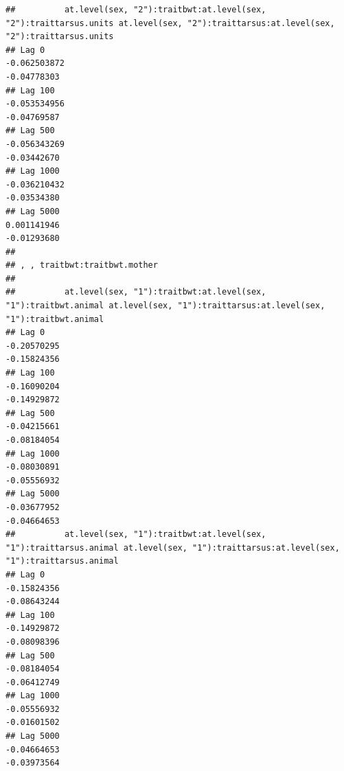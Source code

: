 \documentclass[
  12pt,
]{book}
\begin{document}
\begin{verbatim}
##          at.level(sex, "2"):traitbwt:at.level(sex, "2"):traittarsus.units at.level(sex, "2"):traittarsus:at.level(sex, "2"):traittarsus.units
## Lag 0                                                        -0.062503872                                                         -0.04778303
## Lag 100                                                      -0.053534956                                                         -0.04769587
## Lag 500                                                      -0.056343269                                                         -0.03442670
## Lag 1000                                                     -0.036210432                                                         -0.03534380
## Lag 5000                                                      0.001141946                                                         -0.01293680
## 
## , , traitbwt:traitbwt.mother
## 
##          at.level(sex, "1"):traitbwt:at.level(sex, "1"):traitbwt.animal at.level(sex, "1"):traittarsus:at.level(sex, "1"):traitbwt.animal
## Lag 0                                                       -0.20570295                                                       -0.15824356
## Lag 100                                                     -0.16090204                                                       -0.14929872
## Lag 500                                                     -0.04215661                                                       -0.08184054
## Lag 1000                                                    -0.08030891                                                       -0.05556932
## Lag 5000                                                    -0.03677952                                                       -0.04664653
##          at.level(sex, "1"):traitbwt:at.level(sex, "1"):traittarsus.animal at.level(sex, "1"):traittarsus:at.level(sex, "1"):traittarsus.animal
## Lag 0                                                          -0.15824356                                                          -0.08643244
## Lag 100                                                        -0.14929872                                                          -0.08098396
## Lag 500                                                        -0.08184054                                                          -0.06412749
## Lag 1000                                                       -0.05556932                                                          -0.01601502
## Lag 5000                                                       -0.04664653                                                          -0.03973564

\end{verbatim}
\end{document}
